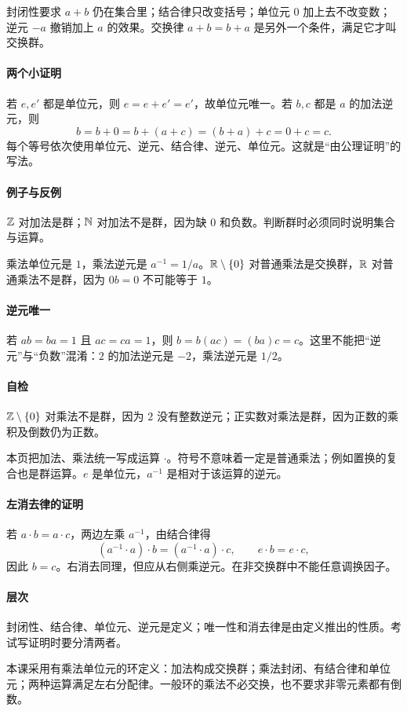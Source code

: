 封闭性要求 $a+b$ 仍在集合里；结合律只改变括号；单位元 $0$ 加上去不改变数；逆元 $-a$ 撤销加上 $a$ 的效果。交换律 $a+b=b+a$ 是另外一个条件，满足它才叫交换群。
\paragraph{两个小证明}若 $e,e'$ 都是单位元，则 $e=e+e'=e'$，故单位元唯一。若 $b,c$ 都是 $a$ 的加法逆元，则
\[b=b+0=b+(a+c)=(b+a)+c=0+c=c.\]
每个等号依次使用单位元、逆元、结合律、逆元、单位元。这就是“由公理证明”的写法。
\paragraph{例子与反例}$\mathbb{Z}$ 对加法是群；$\mathbb{N}$ 对加法不是群，因为缺 $0$ 和负数。判断群时必须同时说明集合与运算。

乘法单位元是 $1$，乘法逆元是 $a^{-1}=1/a$。$\mathbb{R}\setminus\{0\}$ 对普通乘法是交换群，$\mathbb{R}$ 对普通乘法不是群，因为 $0b=0$ 不可能等于 $1$。
\paragraph{逆元唯一}若 $ab=ba=1$ 且 $ac=ca=1$，则 $b=b(ac)=(ba)c=c$。这里不能把“逆元”与“负数”混淆：$2$ 的加法逆元是 $-2$，乘法逆元是 $1/2$。
\paragraph{自检}$\mathbb{Z}\setminus\{0\}$ 对乘法不是群，因为 $2$ 没有整数逆元；正实数对乘法是群，因为正数的乘积及倒数仍为正数。

本页把加法、乘法统一写成运算 $\cdot$。符号不意味着一定是普通乘法；例如置换的复合也是群运算。$e$ 是单位元，$a^{-1}$ 是相对于该运算的逆元。
\paragraph{左消去律的证明}若 $a\cdot b=a\cdot c$，两边左乘 $a^{-1}$，由结合律得
\[(a^{-1}\cdot a)\cdot b=(a^{-1}\cdot a)\cdot c,\qquad e\cdot b=e\cdot c,\]
因此 $b=c$。右消去同理，但应从右侧乘逆元。在非交换群中不能任意调换因子。
\paragraph{层次}封闭性、结合律、单位元、逆元是定义；唯一性和消去律是由定义推出的性质。考试写证明时要分清两者。

本课采用有乘法单位元的环定义：加法构成交换群；乘法封闭、有结合律和单位元；两种运算满足左右分配律。一般环的乘法不必交换，也不要求非零元素都有倒数。
